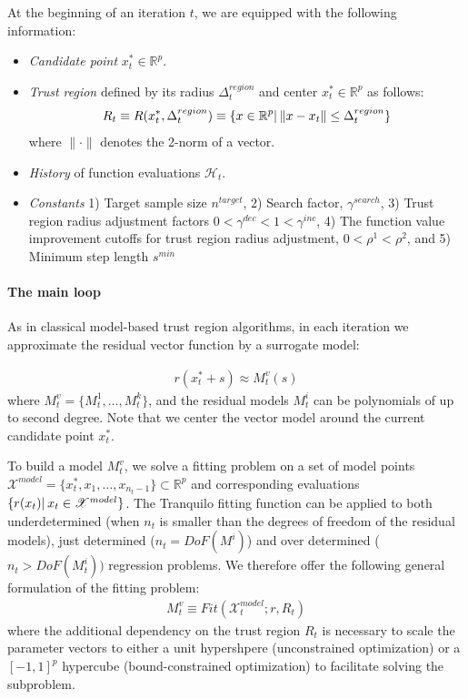 At the beginning of an iteration $t$, we are equipped with the following information:
\begin{itemize}
    \item\textit{Candidate point} $x_t^*\in\mathbb{R}^p$.

\item \textit{Trust region} defined by its radius $\Delta_t^{region}$ and center $x_t^*\in\mathbb{R}^p$ as follows:
\begin{align}
    R_t\equiv R(x_t^*,\Delta_t^{region})\equiv\{x\in\mathbb{R}^p|\hspace{0.2em}\lVert x-x_t\rVert\leq\Delta_t^{region}\}
    \label{eq:def-trustregion}
\end{align}
where $\lVert\cdot\rVert$ denotes the 2-norm of a vector.

\item \textit{History} of function evaluations $\mathcal{H}_t$.

\item \textit{Constants} 1) Target sample size $n^{target}$, 2) Search factor, $\gamma^{search}$, 3) Trust region radius adjustment factors $0<\gamma^{dec}<1<\gamma^{inc}$, 4) The function value improvement cutoffs for trust region radius adjustment, $0<\rho^1<\rho^2$, and 5) Minimum step length $s^{min}$
\end{itemize}


\paragraph{The main loop} As in classical model-based trust region algorithms, in each iteration we approximate the residual vector function by a surrogate model:

\begin{align}
    r(x_t^*+s)\approx M_t^v(s)
    \label{eq:vec-model}
\end{align}
where $M_t^v = \{M_t^1,\dots,M_t^k\}$, and the residual models $M^i_t$ can be polynomials of up to second degree. Note that we center the vector model around the current candidate point $x_t^*$.


To build a model $M_t^v$, we solve a fitting problem on a set of model points $\mathcal{X}^{model}=\{x_t^*,x_1,\dots,x_{n_{t}-1}\}\subset\mathbb{R}^p$ and corresponding evaluations $\{r(x_t)|\hspace{0.2em} x_t\in\mathscr{X}^{model}\}$. The Tranquilo fitting function can be applied to both underdetermined (when $n_t$ is smaller than the degrees of freedom of the residual models), just determined ($n_t=DoF(M^i)$) and over determined ($n_t>DoF(M^i_t))$ regression problems. We therefore offer the following general formulation of the fitting problem:
\begin{align}
    M_t^v\equiv Fit(\mathcal{X}_t^{model};r,R_t)
    \label{eq:fit-model}
\end{align}
where the additional dependency on the trust region $R_t$ is necessary to scale the parameter vectors to either a unit hypershpere (unconstrained optimization) or a $[-1,1]^p$ hypercube (bound-constrained optimization) to facilitate solving the subproblem.

